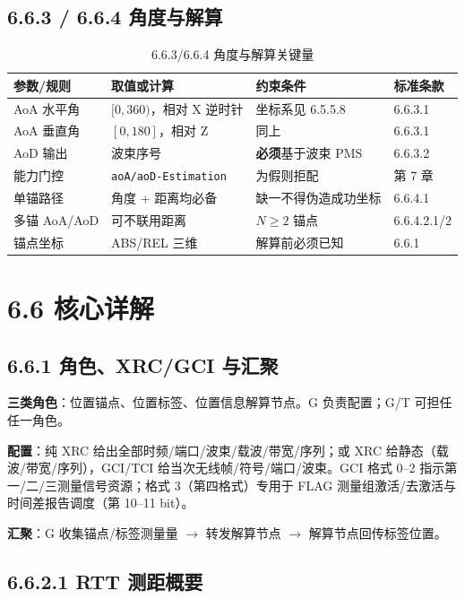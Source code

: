 \documentclass[11pt,a4paper]{ctexart}
\begin{document}
\subsection{6.6.3 / 6.6.4 角度与解算}

\begin{longtable}{L{3cm}L{4.2cm}L{4.5cm}L{2cm}}
\caption{6.6.3/6.6.4 角度与解算关键量\label{tab:6634-fix}} \\
\toprule
\textbf{参数/规则} & \textbf{取值或计算} & \textbf{约束条件} & \textbf{标准条款} \\
\midrule
AoA 水平角 & $[0,360)$，相对 X 逆时针 & 坐标系见 6.5.5.8 & 6.6.3.1 \\
AoA 垂直角 & $[0,180]$，相对 Z & 同上 & 6.6.3.1 \\
AoD 输出 & 波束序号 & \textbf{必须}基于波束 PMS & 6.6.3.2 \\
能力门控 & \texttt{aoA/aoD-Estimation} & 为假则拒配 & 第 7 章 \\
单锚路径 & 角度 + 距离均必备 & 缺一不得伪造成功坐标 & 6.6.4.1 \\
多锚 AoA/AoD & 可不联用距离 & $N{\ge}2$ 锚点 & 6.6.4.2.1/2 \\
锚点坐标 & ABS/REL 三维 & 解算前必须已知 & 6.6.1 \\
\bottomrule
\end{longtable}

\section{6.6 核心详解}

\subsection{6.6.1 角色、XRC/GCI 与汇聚}

\textbf{三类角色}：位置锚点、位置标签、位置信息解算节点。G 负责配置；G/T 可担任任一角色。

\textbf{配置}：纯 XRC 给出全部时频/端口/波束/载波/带宽/序列；或 XRC 给静态（载波/带宽/序列），GCI/TCI 给当次无线帧/符号/端口/波束。GCI 格式 0--2 指示第一/二/三测量信号资源；格式 3（第四格式）专用于 FLAG 测量组激活/去激活与时间差报告调度（第 10--11 bit）。

\textbf{汇聚}：G 收集锚点/标签测量量 $\rightarrow$ 转发解算节点 $\rightarrow$ 解算节点回传标签位置。

\subsection{6.6.2.1 RTT 测距概要}
\end{document}
